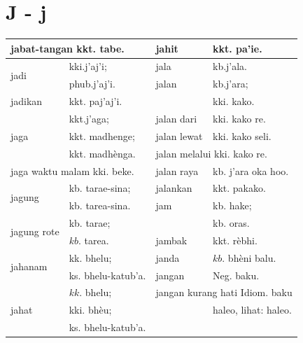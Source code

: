 \documentclass[10pt]{article}
\begin{document}
\section*{J - j}
\begin{center}
\begin{tabular}{|l|l|l|l|}
\hline
\multicolumn{2}{|l|}{jabat-tangan kkt. tabe.} & jahit & kkt. pa'ie. \\
\hline
\multirow[t]{2}{*}{jadi} & kki.j'aj'i; & jala & kb.j'ala. \\
\hline
 & phub.j'aj'i. & jalan & kb.j'ara; \\
\hline
jadikan & kkt. paj'aj'i. &  & kki. kako. \\
\hline
\multirow[t]{3}{*}{jaga} & kkt.j'aga; & jalan dari & kki. kako re. \\
\hline
 & kkt. madhenge; & jalan lewat & kki. kako seli. \\
\hline
 & kkt. madhènga. & \multicolumn{2}{|l|}{jalan melalui kki. kako re.} \\
\hline
\multicolumn{2}{|l|}{jaga waktu malam kki. beke.} & jalan raya & kb. j'ara oka hoo. \\
\hline
\multirow[t]{2}{*}{jagung} & kb. tarae-sina; & jalankan & kkt. pakako. \\
\hline
 & kb. tarea-sina. & jam & kb. hake; \\
\hline
\multirow[t]{2}{*}{jagung rote} & kb. tarae; &  & kb. oras. \\
\hline
 & \(k b\). tarea. & jambak & kkt. rèbhi. \\
\hline
\multirow[t]{2}{*}{jahanam} & kk. bhelu; & janda & \(k b\). bhèni balu. \\
\hline
 & ks. bhelu-katub'a. & jangan & Neg. baku. \\
\hline
\multirow[t]{3}{*}{jahat} & \(k k\). bhelu; & \multicolumn{2}{|l|}{jangan kurang hati Idiom. baku} \\
\hline
 & kki. bhèu; &  & haleo, lihat: haleo. \\
\hline
 & ks. bhelu-katub'a. &  &  \\
\hline
\end{tabular}
\end{center}
\end{document}
